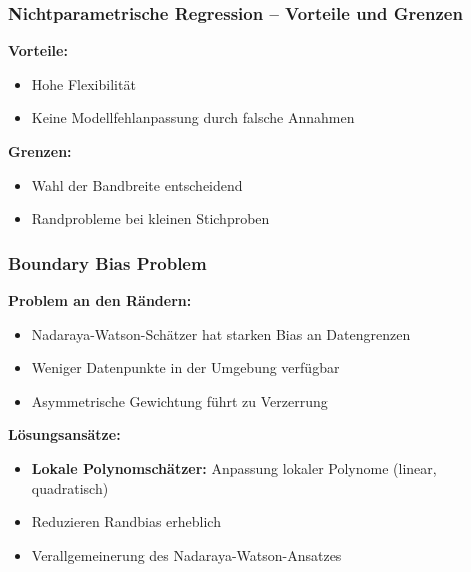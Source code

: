 \documentclass{beamer}
\begin{document}
	
	\begin{frame}
		\frametitle{Nichtparametrische Regression -- Vorteile und Grenzen}
		
		\textbf{Vorteile:}
		\begin{itemize}
			\item Hohe Flexibilität
			\item Keine Modellfehlanpassung durch falsche Annahmen
		\end{itemize}
		
		\vspace{0.5em}
		
		\textbf{Grenzen:}
		\begin{itemize}
			\item Wahl der Bandbreite entscheidend
			\item Randprobleme bei kleinen Stichproben
		\end{itemize}
	\end{frame}
	
	\begin{frame}
		\frametitle{Boundary Bias Problem}
		
		\textbf{Problem an den Rändern:}
		\begin{itemize}
			\item Nadaraya-Watson-Schätzer hat starken Bias an Datengrenzen
			\item Weniger Datenpunkte in der Umgebung verfügbar
			\item Asymmetrische Gewichtung führt zu Verzerrung
		\end{itemize}
		
		\vspace{0.5em}
		
		\textbf{Lösungsansätze:}
		\begin{itemize}
			\item \textbf{Lokale Polynomschätzer:} Anpassung lokaler Polynome (linear, quadratisch)
			\item Reduzieren Randbias erheblich
			\item Verallgemeinerung des Nadaraya-Watson-Ansatzes
		\end{itemize}
	\end{frame}
	
\end{document}
